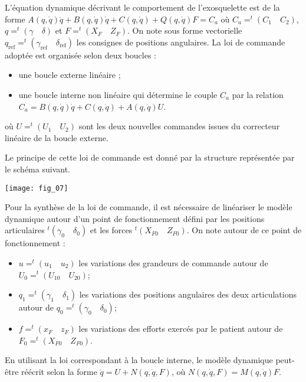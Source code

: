 \begin{multicols}{2}
L’équation dynamique décrivant le comportement de l’exosquelette est de la forme 
$A(q, \dot{q})\ddot{q}+ B(q, \dot{q})\dot{q} + C(q, \dot{q}) + Q(q, \dot{q}) F = C_a$ 
où $C_a = ^t(C_1\quad C_2)$, $q = ^t(\gamma \quad \delta)$ et $F = ^t(X_F \quad Z_F )$. On note sous forme vectorielle $q_{\text{ref}} = ^t(\gamma_{\text{ref}} \quad \delta_{\text{ref}})$ les consignes
de positions angulaires. La loi de commande adoptée est organisée selon deux boucles :
\begin{itemize}
\item une boucle externe linéaire ;
\item une boucle interne non linéaire qui détermine le couple $C_a$ par la relation
$C_a = B(q, \dot{q})\dot{q} + C(q, \dot{q}) + A(q, \dot{q}) U$.
\end{itemize}
où $U = ^t(U_1 \quad U_2)$ sont les deux nouvelles commandes issues du correcteur linéaire de la boucle externe.

Le principe de cette loi de commande est donné par la structure représentée par le schéma suivant.

\begin{center}
\texttt{[image: fig\_07]}
\end{center}


Pour la synthèse de la loi de commande, il est nécessaire de linéariser le modèle dynamique autour d’un point
de fonctionnement défini par les positions articulaires $ ^t(\gamma_0 \quad \delta_0)$ et les forces $ ^t\left(X_{F0}\quad Z_{F0}\right)$. On note autour de ce point de fonctionnement :
\begin{itemize}
\item $ u = ^t\left(u_1\quad u_2\right)$ les variations des grandeurs de commande autour de $ U_0 = ^t\left(U_{10}\quad U_{20}\right)$;
\item $q_1 = ^t\left(\gamma_1 \quad \delta_1\right)$ les variations des positions angulaires des deux articulations autour de $q_0 = ^t\left(\gamma_0 \quad \delta_0\right)$;
\item $ f = ^t\left(x_F \quad z_F \right)$ les variations des efforts exercés par le patient autour de $F_0 =  ^t\left(X_{F0} \quad Z_{F0} \right)$.
\end{itemize}
En utilisant la loi correspondant à la boucle interne, le modèle dynamique peut-être réécrit selon la forme
$\ddot{q}= U + N\left(q, \dot{q}, F\right)$, où $N\left(q, \dot{q}, F\right) = M\left(q, \dot{q}\right) F$.




\end{multicols}
